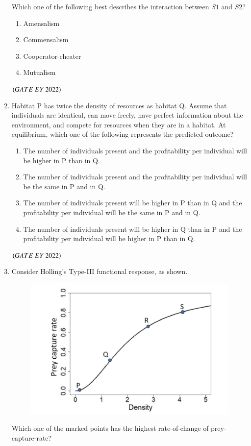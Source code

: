 \documentclass[journal]{IEEEtran}
\numberwithin{equation}{enumi}
\numberwithin{figure}{enumi}
\begin{document}
\begin{enumerate}
\begin{figure}[H]
    \caption{}
    \label{fig:8}
   \end{figure}
Which one of the following best describes the interaction between $S1$ and $S2$?
    \begin{enumerate}
        \item  Amensalism
        \item  Commensalism
        \item  Cooperator-cheater
        \item  Mutualism
    \end{enumerate}
    \hfill{$\brak{ GATE\ EY\ 2022}$}
    \bigskip
 \item Habitat P has twice the density of resources as habitat Q. Assume that individuals are
identical, can move freely, have perfect information about the environment, and
compete for resources when they are in a habitat. At equilibrium, which one of the
following represents the predicted outcome?
    \begin{enumerate}
        \item  The number of individuals present and the profitability per individual will be higher in
P than in Q.
        \item  The number of individuals present and the profitability per individual will be the same
in P and in Q.
        \item  The number of individuals present will be higher in P than in Q and the profitability
per individual will be the same in P and in Q.
        \item  The number of individuals present will be higher in Q than in P and the profitability
per individual will be higher in P than in Q.
    \end{enumerate}
    \hfill{$\brak{ GATE\ EY\ 2022}$}
    \bigskip
 \item Consider Holling's Type-III functional response, as shown.
 \begin{figure}[H]
    \centering
\includegraphics[width=0.5\columnwidth]{figs/9.png}
    \caption{}
    \label{fig:9}
   \end{figure}
 Which one of the marked points has the highest rate-of-change of prey-capture-rate?

\end{enumerate}
\end{document}

